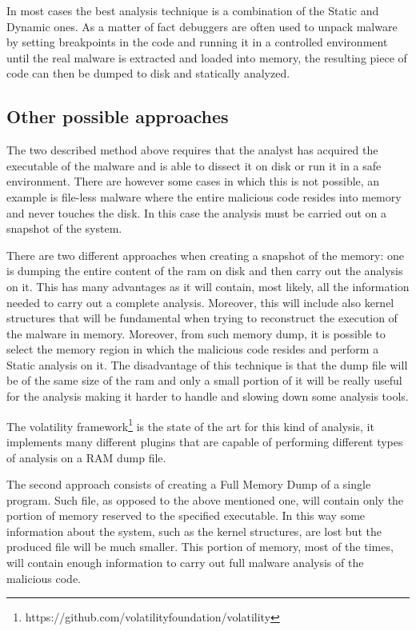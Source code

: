 In most cases the best analysis technique is a combination of the Static and Dynamic ones. As a matter of fact debuggers are often used to unpack malware by setting breakpoints in the code and running it in a controlled environment until the real malware is extracted and loaded into memory, the resulting piece of code can then be dumped to disk and statically analyzed.

\subsection{Other possible approaches}

The two described method above requires that the analyst has acquired the executable of the malware and is able to dissect it on disk or run it in a safe environment. There are however some cases in which this is not possible, an example is file-less malware where the entire malicious code resides into memory and never touches the disk. In this case the analysis must be carried out on a snapshot of the system. 

There are two different approaches when creating a snapshot of the memory: one is dumping the entire content of the ram on disk and then carry out the analysis on it. This has many advantages as it will contain, most likely, all the information needed to carry out a complete analysis. Moreover, this will include also kernel structures that will be fundamental when trying to reconstruct the execution of the malware in memory. Moreover, from such memory dump, it is possible to select the memory region in which the malicious code resides and perform a Static analysis on it. The disadvantage of this technique is that the dump file will be of the same size of the ram and only a small portion of it will be really useful for the analysis making it harder to handle and slowing down some analysis tools. 

The volatility framework\footnote{https://github.com/volatilityfoundation/volatility} is the state of the art for this kind of analysis, it implements many different plugins that are capable of performing different types of analysis on a RAM dump file. 

The second approach consists of creating a Full Memory Dump of a single program. Such file, as opposed to the above mentioned one, will contain only the portion of memory reserved to the specified executable. In this way some information about the system, such as the kernel structures, are lost but the produced file will be much smaller. This portion of memory, most of the times, will contain enough information to carry out full malware analysis of the malicious code.   


